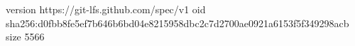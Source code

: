 version https://git-lfs.github.com/spec/v1
oid sha256:d0fbb8fe5ef7b646b6bd04e8215958dbc2c7d2700ae0921a6153f5f349298acb
size 5566
